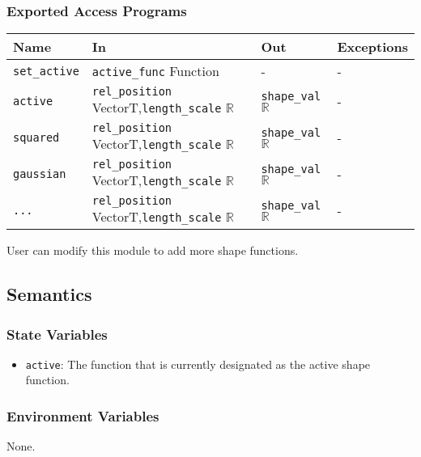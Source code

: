 \documentclass[12pt, titlepage]{article}
\begin{document}
\subsubsection{Exported Access Programs}
\begin{center}
\begin{tabular}{p{2cm} p{5.6cm} p{3cm} p{2cm}}
\hline
\textbf{Name} & \textbf{In} & \textbf{Out} & \textbf{Exceptions} \\
\hline
\texttt{set\_active} & \texttt{active\_func} Function & - & - \\
\texttt{active}& \texttt{rel\_position} VectorT,\newline\texttt{length\_scale} $\mathbb{R}$ & \texttt{shape\_val} $\mathbb{R}$ & - \\
\texttt{squared}& \texttt{rel\_position} VectorT,\newline\texttt{length\_scale} $\mathbb{R}$ & \texttt{shape\_val} $\mathbb{R}$ & - \\
\texttt{gaussian}& \texttt{rel\_position} VectorT,\newline\texttt{length\_scale} $\mathbb{R}$ & \texttt{shape\_val} $\mathbb{R}$ & - \\
\texttt{...}& \texttt{rel\_position} VectorT,\newline\texttt{length\_scale} $\mathbb{R}$ & \texttt{shape\_val} $\mathbb{R}$ & - \\
\hline
\end{tabular}
\end{center}
User can modify this module to add more shape functions.

\subsection{Semantics}

\subsubsection{State Variables}
\begin{itemize}
  \item \texttt{active}: The function that is currently designated as the active shape function.
\end{itemize}

\subsubsection{Environment Variables}
None.
\end{document}
